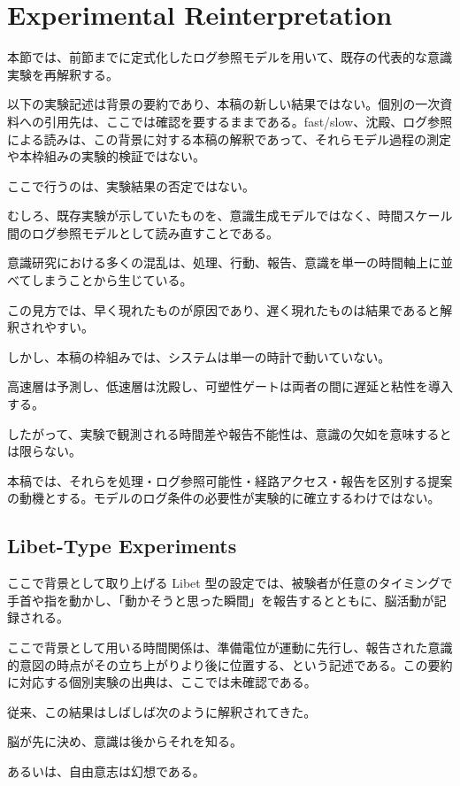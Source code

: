 \section{Experimental Reinterpretation}


本節では、前節までに定式化したログ参照モデルを用いて、既存の代表的な意識実験を再解釈する。

以下の実験記述は背景の要約であり、本稿の新しい結果ではない。個別の一次資料への引用先は、ここでは確認を要するままである。fast/slow、沈殿、ログ参照による読みは、この背景に対する本稿の解釈であって、それらモデル過程の測定や本枠組みの実験的検証ではない。

ここで行うのは、実験結果の否定ではない。

むしろ、既存実験が示していたものを、意識生成モデルではなく、時間スケール間のログ参照モデルとして読み直すことである。

意識研究における多くの混乱は、処理、行動、報告、意識を単一の時間軸上に並べてしまうことから生じている。

この見方では、早く現れたものが原因であり、遅く現れたものは結果であると解釈されやすい。

しかし、本稿の枠組みでは、システムは単一の時計で動いていない。

高速層は予測し、低速層は沈殿し、可塑性ゲートは両者の間に遅延と粘性を導入する。

したがって、実験で観測される時間差や報告不能性は、意識の欠如を意味するとは限らない。

本稿では、それらを処理・ログ参照可能性・経路アクセス・報告を区別する提案の動機とする。モデルのログ条件の必要性が実験的に確立するわけではない。

\subsection{Libet-Type Experiments}

ここで背景として取り上げる Libet 型の設定では、被験者が任意のタイミングで手首や指を動かし、「動かそうと思った瞬間」を報告するとともに、脳活動が記録される。

ここで背景として用いる時間関係は、準備電位が運動に先行し、報告された意識的意図の時点がその立ち上がりより後に位置する、という記述である。この要約に対応する個別実験の出典は、ここでは未確認である。

従来、この結果はしばしば次のように解釈されてきた。

脳が先に決め、意識は後からそれを知る。

あるいは、自由意志は幻想である。


